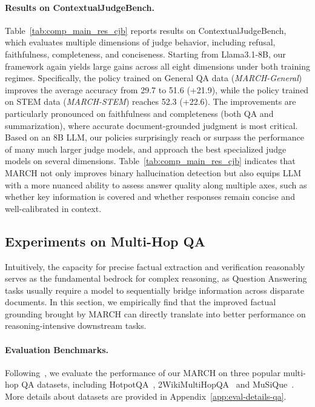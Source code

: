 \documentclass[10pt, a4paper, logo]{googledeepmind} %
\begin{document}
\paragraph{Results on ContextualJudgeBench.} Table~\ref{tab:comp_main_res_cjb} reports results on ContextualJudgeBench, which evaluates multiple dimensions of judge behavior, including refusal, faithfulness, completeness, and conciseness. Starting from Llama3.1-8B, our framework again yields large gains across all eight dimensions under both training regimes. Specifically, the policy trained on General QA data (\textit{MARCH-General}) improves the average accuracy from 29.7 to 51.6 ({+21.9}), while the policy trained on STEM data (\textit{MARCH-STEM}) reaches 52.3 ({+22.6}). The improvements are particularly pronounced on faithfulness and completeness (both QA and summarization), where accurate document-grounded judgment is most critical. Based on an 8B LLM, our policies surprisingly reach or surpass the performance of many much larger judge models, and approach the best specialized judge models on several dimensions. Table~\ref{tab:comp_main_res_cjb} indicates that MARCH not only improves binary hallucination detection but also equips LLM with a more nuanced ability to assess answer quality along multiple axes, such as whether key information is covered and whether responses remain concise and well-calibrated in context.

\subsection{Experiments on Multi-Hop QA}
Intuitively, the capacity for precise factual extraction and verification reasonably serves as the fundamental bedrock for complex reasoning, as Question Answering tasks usually require a model to sequentially bridge information across disparate documents. 
In this section, we empirically find that the improved factual grounding brought by MARCH can directly translate into better performance on reasoning-intensive downstream tasks.

\paragraph{Evaluation Benchmarks.} Following~\citet{xu2025collab,trivedi2023interleaving,shao2023enhancing}, we evaluate the performance of our MARCH on three popular multi-hop QA datasets, including HotpotQA~\citep{yang2018hotpotqa}, 2WikiMultiHopQA~\citep{ho2020constructing} and MuSiQue~\citep{trivedi2022musique}. More details about datasets are provided in Appendix~\ref{app:eval-details-qa}.
\end{document}
